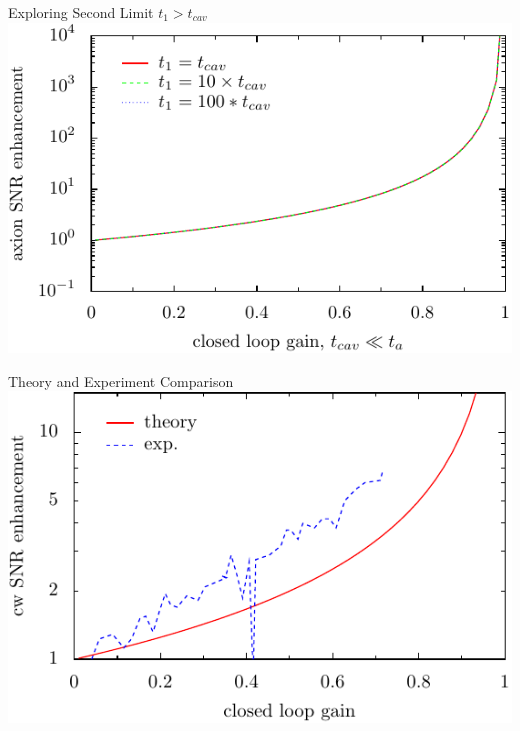 \documentclass{beamer}
\begin{document}
\begin{frame}{Exploring Second Limit}
{\tiny $t_1 > t_{cav}$}
\includegraphics[width=\textwidth]{exploring_second_limit_high}
\end{frame}

\begin{frame}{Theory and Experiment}
{Comparison}
\includegraphics[width=\textwidth]{comparison_xaxis_gain}
\end{frame}
\end{document}
